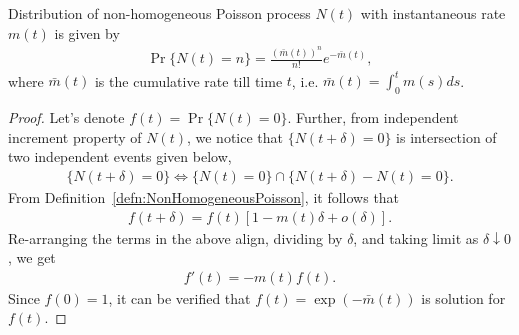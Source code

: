 \documentclass[a4paper,10pt,english]{article}
\begin{document}
\begin{prop} Distribution of non-homogeneous Poisson process $N(t)$ with instantaneous rate $m(t)$ is given by
 \begin{align*}
 \Pr\{N(t)=n\}=\frac{(\bar{m}(t))^n}{n!}e^{-\bar{m}(t)},
 \end{align*}
where $\bar{m}(t)$ is the cumulative rate till time $t$, i.e. $\bar{m}(t)=\int_{0}^{t}m(s)ds$. 
\end{prop}
\begin{proof}
Let's denote $f(t) = \Pr\{N(t)=0\}$. Further, from independent increment property of $N(t)$, we notice that $\{N(t+\delta) = 0\}$ is intersection of two independent events given below, 
\begin{align*}
\{N(t+\delta)=0\} \iff \{N(t)=0\}\cap\{N(t+\delta)-N(t)=0\}.
\end{align*}
From Definition~\ref{defn:NonHomogeneousPoisson}, it follows that
\begin{align*}
 f(t+\delta) = f(t)[1 - m(t)\delta + o(\delta)].
\end{align*}
Re-arranging the terms in the above align, dividing by $\delta$, and taking limit as $\delta \downarrow 0$, we get 
\begin{align*}
f'(t) = -m(t)f(t).
\end{align*}
Since $f(0) = 1$, it can be verified that $f(t) = \exp(-\bar{m}(t))$ is solution for $f(t)$.

\end{proof}
\end{document}
